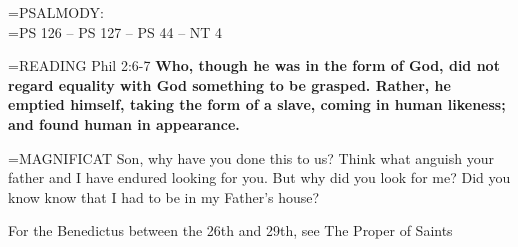 \hangindent=\parindent \small{PSALMODY:}\\
\hangindent=\parindent  PS 126 -- PS 127 -- PS 44 -- NT 4\vspace{0.5em}

\hangindent=\parindent \small{READING}    Phil 2:6-7 \textbf{   Who, though he was in the form of God, did not regard equality with God something to be grasped. Rather, he emptied himself, taking the form of a slave, coming in human likeness; and found human in appearance.\\}

\hangindent=\parindent \small{MAGNIFICAT 	Son, why have you done this to us? Think what anguish your father and I have endured looking for you. But why did you look for me? Did you know know that I had to be in my Father's house?\\}

For the Benedictus between the 26th and 29th, see The Proper of Saints
